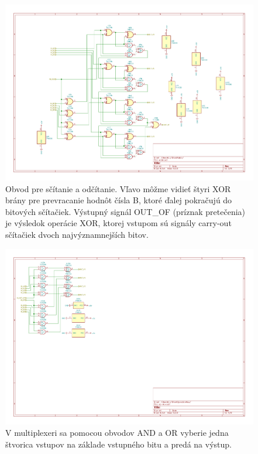 \documentclass{article}
\begin{document}
    \begin{figure}[h!]
        \centering
        \includegraphics[width=.9\linewidth]{adder_sheet.pdf}
        \caption{Obvod pre sčítanie a odčítanie. Vľavo môžme vidieť štyri XOR brány pre prevracanie hodnôt čísla B, ktoré ďalej pokračujú do bitových sčítačiek. Výstupný signál OUT\_OF (príznak pretečenia) je výsledok operácie XOR, ktorej vstupom sú signály carry-out sčítačiek dvoch najvýznamnejších bitov.}
    \end{figure}

    \begin{figure}[h!]
        \centering
        \includegraphics[width=.9\linewidth]{mux_sheet.pdf}
        \caption{V multiplexeri sa pomocou obvodov AND a OR vyberie jedna štvorica vstupov na základe vstupného bitu a predá na výstup.}
    \end{figure}
    
\end{document}
